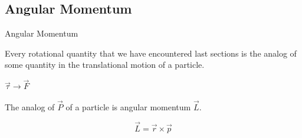 \documentclass[]{beamer}
\begin{document}
\subsection{Angular Momentum}

\begin{frame}


Angular Momentum

\vspace{7mm}

Every rotational quantity that we have encountered last sections is the
analog of some quantity in the translational motion of a particle.

\vspace{7mm}
\pause

$\vec{\tau}\rightarrow\vec{F}$

 \pause

 
 \vspace{7mm}

 The analog of $\vec{P}$ of a particle is angular momentum $\vec{L}$.
 \pause

 \vspace{7mm}


 \begin{equation}
  \vec{L}=\vec{r}\times\vec{p}
 \end{equation}

\end{frame}



\end{document}
